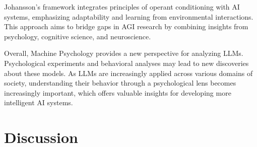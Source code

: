 \documentclass[12pt,letterpaper]{article}
\begin{document}
Johansson's framework integrates principles of operant conditioning \citep{OperantConditioning} with AI systems, emphasizing adaptability and learning from environmental interactions. This approach aims to bridge gaps in AGI research by combining insights from psychology, cognitive science, and neuroscience.

Overall, Machine Psychology provides a new perspective for analyzing LLMs. Psychological experiments and behavioral analyses may lead to new discoveries about these models. As LLMs are increasingly applied across various domains of society, understanding their behavior through a psychological lens becomes increasingly important, which offers valuable insights for developing more intelligent AI systems.


\section*{Discussion} \label{sec:Discussion}
\end{document}
